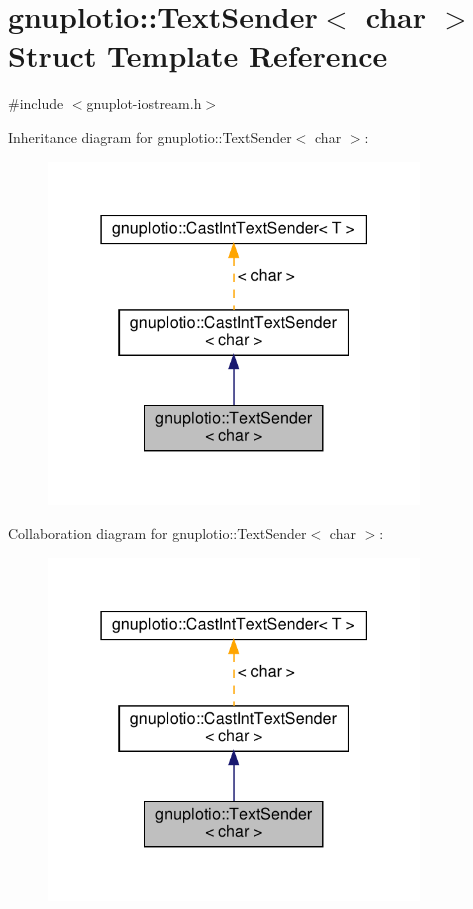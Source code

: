 \hypertarget{structgnuplotio_1_1_text_sender_3_01char_01_4}{}\section{gnuplotio\+:\+:Text\+Sender$<$ char $>$ Struct Template Reference}
\label{structgnuplotio_1_1_text_sender_3_01char_01_4}


{\ttfamily \#include $<$gnuplot-\/iostream.\+h$>$}



Inheritance diagram for gnuplotio\+:\+:Text\+Sender$<$ char $>$\+:
\nopagebreak
\begin{figure}[H]
\begin{center}
\leavevmode
\includegraphics[width=279pt]{structgnuplotio_1_1_text_sender_3_01char_01_4__inherit__graph}
\end{center}
\end{figure}


Collaboration diagram for gnuplotio\+:\+:Text\+Sender$<$ char $>$\+:
\nopagebreak
\begin{figure}[H]
\begin{center}
\leavevmode
\includegraphics[width=279pt]{structgnuplotio_1_1_text_sender_3_01char_01_4__coll__graph}
\end{center}
\end{figure}
